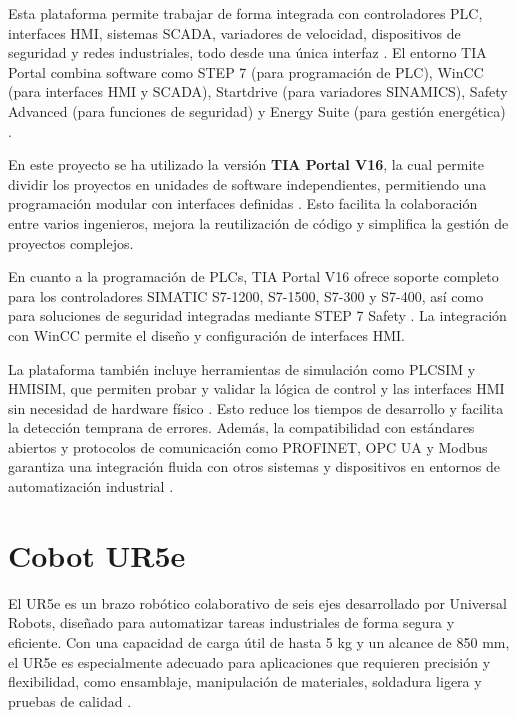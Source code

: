 Esta plataforma permite trabajar de forma integrada con controladores PLC, interfaces HMI, sistemas SCADA, variadores de velocidad, dispositivos de seguridad y redes industriales, todo desde una única interfaz \cite{TIA_portal}. El entorno TIA Portal combina software como STEP 7 (para programación de PLC), WinCC (para interfaces HMI y SCADA), Startdrive (para variadores SINAMICS), Safety Advanced (para funciones de seguridad) y Energy Suite (para gestión energética) \cite{TIA_portal}.

En este proyecto se ha utilizado la versión \textbf{TIA Portal V16}, la cual permite dividir los proyectos en unidades de software independientes, permitiendo una programación modular con interfaces definidas \cite{TIA_portal}. Esto facilita la colaboración entre varios ingenieros, mejora la reutilización de código y simplifica la gestión de proyectos complejos.

En cuanto a la programación de PLCs, TIA Portal V16 ofrece soporte completo para los controladores SIMATIC S7-1200, S7-1500, S7-300 y S7-400, así como para soluciones de seguridad integradas mediante STEP 7 Safety \cite{TIA_portal}. La integración con WinCC permite el diseño y configuración de interfaces HMI.

La plataforma también incluye herramientas de simulación como PLCSIM y HMISIM, que permiten probar y validar la lógica de control y las interfaces HMI sin necesidad de hardware físico \cite{TIA_portal}. Esto reduce los tiempos de desarrollo y facilita la detección temprana de errores. Además, la compatibilidad con estándares abiertos y protocolos de comunicación como PROFINET, OPC UA y Modbus garantiza una integración fluida con otros sistemas y dispositivos en entornos de automatización industrial \cite{TIA_portal}.

\section{Cobot UR5e}
\label{sec:ur5e}

El UR5e es un brazo robótico colaborativo de seis ejes desarrollado por Universal Robots, diseñado para automatizar tareas industriales de forma segura y eficiente. Con una capacidad de carga útil de hasta 5 kg y un alcance de 850 mm, el UR5e es especialmente adecuado para aplicaciones que requieren precisión y flexibilidad, como ensamblaje, manipulación de materiales, soldadura ligera y pruebas de calidad \cite{UR5e}.

